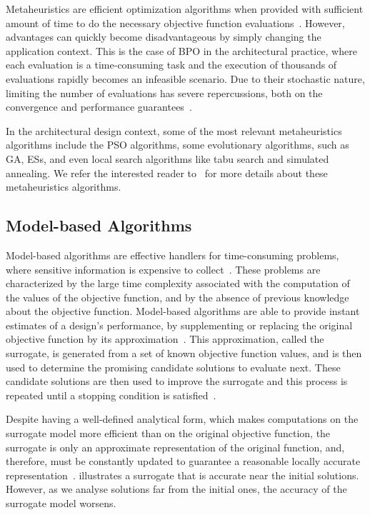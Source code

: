 	Metaheuristics are efficient optimization algorithms when provided with sufficient amount of time to do the necessary objective function evaluations~\cite{Conn2009}. However, advantages can quickly become disadvantageous by simply changing the application context. This is the case of \ac{BPO} in the architectural practice, where each evaluation is a time-consuming task and the execution of thousands of evaluations rapidly becomes an infeasible scenario. Due to their stochastic nature, limiting the number of evaluations has severe repercussions, both on the convergence and performance guarantees~\cite{Hasancebi2009}. 
	
	In the architectural design context, some of the most relevant metaheuristics algorithms include the \ac{PSO} algorithms, some evolutionary algorithms, such as \ac{GA}, \acp{ES}, and even local search algorithms like tabu search and simulated annealing. We refer the interested reader to~\cite{BlumRoli2003Metaheuristics,Glover2003Metaheuristics} for more details about these metaheuristics algorithms.
	
\subsection{Model-based Algorithms}
\label{ssec:model-based}
	Model-based algorithms are effective handlers for time-consuming problems, where sensitive information is expensive to collect~\cite{Forrester2009SBO, Wortmann2016BBO}. These problems are characterized by the large time complexity associated with the computation of the values of the objective function, and by the absence of previous knowledge about the objective function. Model-based algorithms are able to provide instant estimates of a design’s performance, by supplementing or replacing the original objective function by its approximation~\cite{Wortmann2016BBO}. This approximation, called the surrogate, is generated from a set of known objective function values, and is then used to determine the promising candidate solutions to evaluate next. These candidate solutions are then used to improve the surrogate and this process is repeated until a stopping condition is satisfied~\cite{Koziel2011}.

	Despite having a well-defined analytical form, which makes computations on the surrogate model more efficient than on the original objective function, the surrogate is only an approximate representation of the original function, and, therefore, must be constantly updated to guarantee a reasonable locally accurate representation~\cite{Koziel2011}.  illustrates a surrogate that is accurate near the initial solutions. However, as we analyse solutions far from the initial ones, the accuracy of the surrogate model worsens.
	

